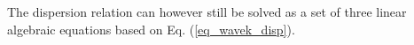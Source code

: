 The dispersion relation can however still be solved \cite[pp. 667]{born1999book} as a set of three linear algebraic equations based on Eq. (\ref{eq_wavek_disp}).

